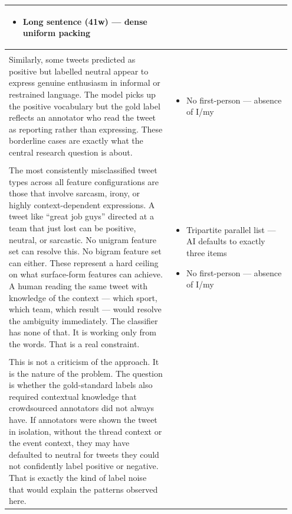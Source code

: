 \documentclass[11pt]{article}
\begin{document}
\begin{longtable}{|p{0.55\linewidth}|p{0.40\linewidth}|}
\begin{itemize}[leftmargin=1em,itemsep=1pt,topsep=1pt,parsep=0pt]
  \item Long sentence (41w) --- dense uniform packing
\end{itemize} \\[2pt]
\hline
\rule[-3.5cm]{0pt}{3.5cm} & \\
\hline
Similarly, some tweets predicted as positive but labelled neutral appear to express genuine enthusiasm in informal or restrained language. The model picks up the positive vocabulary but the gold label reflects an annotator who read the tweet as reporting rather than expressing. These borderline cases are exactly what the central research question is about. & \begin{itemize}[leftmargin=1em,itemsep=1pt,topsep=1pt,parsep=0pt]
  \item No first-person --- absence of I/my
\end{itemize} \\[2pt]
\hline
\rule[-3.5cm]{0pt}{3.5cm} & \\
\hline
The most consistently misclassified tweet types across all feature configurations are those that involve sarcasm, irony, or highly context-dependent expressions. A tweet like ``great job guys'' directed at a team that just lost can be positive, neutral, or sarcastic. No unigram feature set can resolve this. No bigram feature set can either. These represent a hard ceiling on what surface-form features can achieve. A human reading the same tweet with knowledge of the context --- which sport, which team, which result --- would resolve the ambiguity immediately. The classifier has none of that. It is working only from the words. That is a real constraint. & \begin{itemize}[leftmargin=1em,itemsep=1pt,topsep=1pt,parsep=0pt]
  \item Tripartite parallel list --- AI defaults to exactly three items
  \item No first-person --- absence of I/my
\end{itemize} \\[2pt]
\hline
\rule[-3.5cm]{0pt}{3.5cm} & \\
\hline
This is not a criticism of the approach. It is the nature of the problem. The question is whether the gold-standard labels also required contextual knowledge that crowdsourced annotators did not always have. If annotators were shown the tweet in isolation, without the thread context or the event context, they may have defaulted to neutral for tweets they could not confidently label positive or negative. That is exactly the kind of label noise that would explain the patterns observed here. & \begin{itemize}[leftmargin=1em,itemsep=1pt,topsep=1pt,parsep=0pt]

\end{itemize}
\end{longtable}
\end{document}
